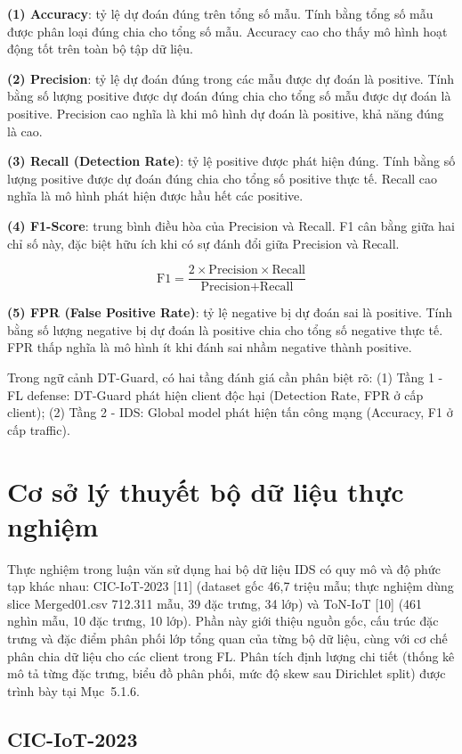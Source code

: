 \textbf{(1) Accuracy}: tỷ lệ dự đoán đúng trên tổng số mẫu. Tính bằng tổng số mẫu được phân loại đúng chia cho tổng số mẫu. Accuracy cao cho thấy mô hình hoạt động tốt trên toàn bộ tập dữ liệu.

\textbf{(2) Precision}: tỷ lệ dự đoán đúng trong các mẫu được dự đoán là positive. Tính bằng số lượng positive được dự đoán đúng chia cho tổng số mẫu được dự đoán là positive. Precision cao nghĩa là khi mô hình dự đoán là positive, khả năng đúng là cao.

\textbf{(3) Recall (Detection Rate)}: tỷ lệ positive được phát hiện đúng. Tính bằng số lượng positive được dự đoán đúng chia cho tổng số positive thực tế. Recall cao nghĩa là mô hình phát hiện được hầu hết các positive.

\textbf{(4) F1-Score}: trung bình điều hòa của Precision và Recall. F1 cân bằng giữa hai chỉ số này, đặc biệt hữu ích khi có sự đánh đổi giữa Precision và Recall.

\[\text{F1} = \frac{2 \times \text{Precision} \times \text{Recall}}{\text{Precision} + \text{Recall}}\]

\textbf{(5) FPR (False Positive Rate)}: tỷ lệ negative bị dự đoán sai là positive. Tính bằng số lượng negative bị dự đoán là positive chia cho tổng số negative thực tế. FPR thấp nghĩa là mô hình ít khi đánh sai nhầm negative thành positive.

Trong ngữ cảnh DT-Guard, có hai tầng đánh giá cần phân biệt rõ: (1) Tầng 1 - FL defense: DT-Guard phát hiện client độc hại (Detection Rate, FPR ở cấp client); (2) Tầng 2 - IDS: Global model phát hiện tấn công mạng (Accuracy, F1 ở cấp traffic).

\section{Cơ sở lý thuyết bộ dữ liệu thực nghiệm}
Thực nghiệm trong luận văn sử dụng hai bộ dữ liệu IDS có quy mô và độ phức tạp khác nhau: CIC-IoT-2023 {[}11{]} (dataset gốc 46,7 triệu mẫu; thực nghiệm dùng slice Merged01.csv 712.311 mẫu, 39 đặc trưng, 34 lớp) và ToN-IoT {[}10{]} (461 nghìn mẫu, 10 đặc trưng, 10 lớp). Phần này giới thiệu nguồn gốc, cấu trúc đặc trưng và đặc điểm phân phối lớp tổng quan của từng bộ dữ liệu, cùng với cơ chế phân chia dữ liệu cho các client trong FL. Phân tích định lượng chi tiết (thống kê mô tả từng đặc trưng, biểu đồ phân phối, mức độ skew sau Dirichlet split) được trình bày tại Mục~5.1.6.

\subsection{CIC-IoT-2023}

